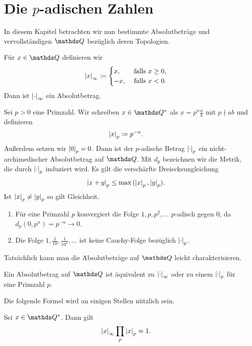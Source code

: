\chapter{Die $p$-adischen Zahlen}
In diesem Kapitel betrachten wir nun bestimmte Absolutbeträge und vervollständigen $\Q$ bezüglich deren Topologien.

Für $x\in \Q$ definieren wir
\begin{align*}
\left\vert x\right\vert_\infty\coloneqq\begin{cases}
x, &\text{ falls } x\geq 0,\\
-x, &\text{ falls } x<0.
\end{cases}
\end{align*}
Dann ist $\left\vert\cdot\right\vert_\infty$ ein Absolutbetrag.

Sei $p>0$ eine Primzahl. Wir schreiben $x\in \Q^\ast$ als $x=p^n \frac{a}{b}$ mit $p \nmid ab$ und definieren
\begin{align*}
\left\vert x\right\vert_p \coloneqq p^{-n}.
\end{align*}
Außerdem setzen wir $\left\vert0\right\vert_p=0$.
Dann ist der $p$-adische Betrag $\left\vert\cdot\right\vert_p$ ein nicht-archimedischer Absolutbetrag auf $\Q$.
Mit $d_p$ bezeichnen wir die Metrik, die durch $\left\vert\cdot\right\vert_p$ induziert wird.
Es gilt die verschärfte Dreiecksungleichung
\begin{align*}
\left\vert x+y\right\vert_p\leq \max{(\left\vert x\right\vert_p,\left\vert y\right\vert_p)}.
\end{align*}
Ist $\left\vert x\right\vert_p \not= \left\vert y\right\vert_p$ so gilt Gleichheit.
\begin{bsp}

\begin{enumerate}[label=\roman*)]
\item Für eine Primzahl $p$ konvergiert die Folge $1,p,p^2,\dots$ $p$-adisch gegen $0$, da $d_p(0,p^n)=p^{-n}\to 0$.
\item Die Folge $1,\frac{1}{10},\frac{1}{10^2},\dots$ ist keine Cauchy-Folge bezüglich $\left\vert\cdot\right\vert_p$.
\end{enumerate}
\end{bsp}

Tatsächlich kann man die Absolutbeträge auf $\Q$ leicht charakterisieren.
\begin{thm}[Ostrowski]
Ein Absolutbetrag auf $\Q$ ist äquivalent zu $\left\vert\cdot\right\vert_\infty$ oder zu einem $\left\vert\cdot\right\vert_p$ für eine Primzahl $p$.
\end{thm}

Die folgende Formel wird an einigen Stellen nützlich sein.

\begin{satz}[Produktformel]
Sei $x\in \Q^\ast$. Dann gilt
\begin{align*}
\left\vert x\right\vert_\infty \prod_p \left\vert x\right\vert_p=1.
\end{align*}
\end{satz}

